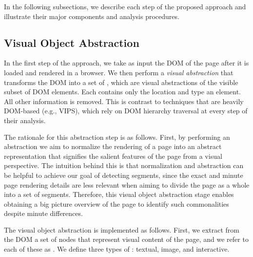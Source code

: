 In the following subsections,
we describe each step of the proposed approach
and illustrate their major components and analysis procedures.

\subsection{Visual Object Abstraction}
\label{subsec:abstraction}
In the first step of the approach,
we take as input the DOM of the page
after it is loaded and rendered in a browser.
We then perform a \emph{visual abstraction} that 
transforms the DOM into a set of \emph{\vizobjs},
which are visual abstractions of the visible subset of DOM elements.
Each {\vizobj} contains only the location and type an element.
All other information is removed. This is contrast to techniques 
that are heavily DOM-based (e.g., VIPS), which rely on DOM hierarchy 
traversal at every step of their analysis.

The rationale for this abstraction step is as follows.
First, by performing an abstraction
we aim to normalize the rendering of a page
into an abstract representation 
that signifies the salient features of the page
from a visual perspective.
The intuition behind this is that
normalization and abstraction can be helpful to 
achieve our goal of detecting segments, 
since the exact and minute page rendering details
are less relevant when aiming to divide the page as a whole
into a set of segments. 
Therefore, this visual object abstraction stage
enables obtaining a big picture overview of the page
to identify such commonalities despite minute differences.


The visual object abstraction is implemented as follows.
First, we extract from the DOM a set of nodes that 
represent visual content of the page, 
and we refer to each of these as \emph{{\VizObjs}}.
We define three types of {\VizObjs}:
textual, image, and interactive.

